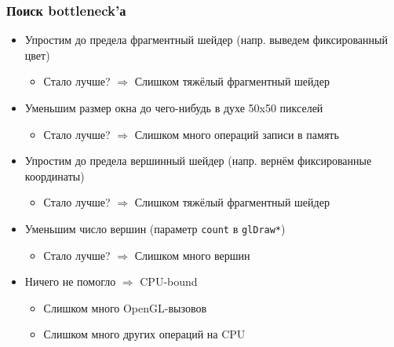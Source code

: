 \documentclass{beamer}
\begin{document}
\begin{frame}[fragile]
\fontsize{10pt}{10pt}
\frametitle{Поиск bottleneck'а}
\begin{itemize}
\item Упростим до предела фрагментный шейдер (напр. выведем фиксированный цвет)
\pause
\begin{itemize}
\item Стало лучше? \begin{math}\Rightarrow\end{math} Слишком тяжёлый фрагментный шейдер
\end{itemize}
\pause
\item Уменьшим размер окна до чего-нибудь в духе 50x50 пикселей
\pause
\begin{itemize}
\item Стало лучше? \begin{math}\Rightarrow\end{math} Слишком много операций записи в память
\end{itemize}
\pause
\item Упростим до предела вершинный шейдер (напр. вернём фиксированные координаты)
\pause
\begin{itemize}
\item Стало лучше? \begin{math}\Rightarrow\end{math} Слишком тяжёлый фрагментный шейдер
\end{itemize}
\pause
\item Уменьшим число вершин (параметр \verb|count| в \verb|glDraw*|)
\pause
\begin{itemize}
\item Стало лучше? \begin{math}\Rightarrow\end{math} Слишком много вершин
\end{itemize}
\pause
\item Ничего не помогло \begin{math}\Rightarrow\end{math} CPU-bound
\pause
\begin{itemize}
\item Слишком много OpenGL-вызовов
\pause
\item Слишком много других операций на CPU
\end{itemize}
\end{itemize}
\end{frame}
\end{document}
